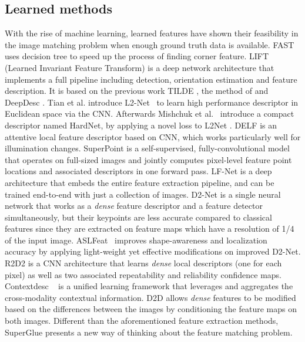 \subsection{Learned methods}
With the rise of machine learning, learned features have shown their feasibility in the image matching problem when enough ground truth data is available. 
FAST \cite{rosten2006machine} uses decision tree to speed up the process of finding corner feature. 
LIFT (Learned Invariant Feature Transform) \cite{yi2016lift} is a deep network architecture that implements a full pipeline including detection, orientation estimation and feature description. It is based on the previous work TILDE \cite{verdie2015tilde}, the method of \cite{moo2016learning} and DeepDesc \cite{simo2015discriminative}. 
Tian et al. introduce L2-Net~\cite{tian2017l2} to learn high performance descriptor in Euclidean space via the \ac{CNN}. 
Afterwards Mishchuk et al.~\cite{mishchuk2017working} introduce a compact descriptor named HardNet, by applying a novel loss to L2Net \cite{tian2017l2}. 
DELF \cite{noh2017DELF} is an attentive local feature descriptor based on \ac{CNN}, which works particularly well for illumination changes.
SuperPoint \cite{detone2018superpoint} is a self-supervised, fully-convolutional model that operates on full-sized images and jointly computes pixel-level feature point locations and associated descriptors in one forward pass. 
LF-Net \cite{ono2018lf} is a deep architecture that embeds the entire feature extraction pipeline, and can be trained end-to-end with just a collection of images. 
D2-Net \cite{dusmanu2019d2} is a single neural network that works as a \textit{dense} feature descriptor and a feature detector simultaneously, but their keypoints are less accurate compared to classical features since they are extracted on feature maps which have a resolution of 1/4 of the input image.
ASLFeat~\cite{luo2020aslfeat} improves shape-awareness and localization accuracy by applying light-weight yet effective modifications on improved D2-Net.
R2D2 \cite{revaud2019r2d2} is a \ac{CNN} architecture that learns \textit{dense} local descriptors (one for each pixel) as well as two associated repeatability and reliability confidence maps.
Contextdesc ~\cite{luo2019contextdesc} is a unified learning framework that leverages and aggregates the cross-modality contextual information.
D2D \cite{wiles2020d2d} allows \textit{dense} features to be modified based on the differences between the images by conditioning the feature maps on both images. 
Different than the aforementioned feature extraction methods, SuperGlue \cite{sarlin2020superglue} presents a new way of thinking about the feature matching problem. 
